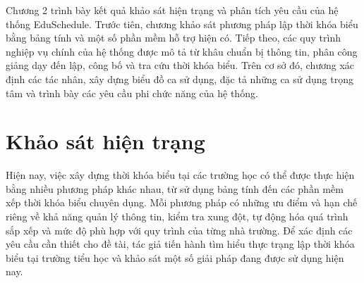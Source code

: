 \documentclass[../DoAn.tex]{subfiles}
\begin{document}




Chương 2 trình bày kết quả khảo sát hiện trạng và phân tích yêu cầu của hệ thống EduSchedule. Trước tiên, chương khảo sát phương pháp lập thời khóa biểu bằng bảng tính và một số phần mềm hỗ trợ hiện có. Tiếp theo, các quy trình nghiệp vụ chính của hệ thống được mô tả từ khâu chuẩn bị thông tin, phân công giảng dạy đến lập, công bố và tra cứu thời khóa biểu. Trên cơ sở đó, chương xác định các tác nhân, xây dựng biểu đồ ca sử dụng, đặc tả những ca sử dụng trọng tâm và trình bày các yêu cầu phi chức năng của hệ thống.
\section{Khảo sát hiện trạng}
\label{section:2.1}

Hiện nay, việc xây dựng thời khóa biểu tại các trường học có thể được thực hiện bằng nhiều phương pháp khác nhau, từ sử dụng bảng tính đến các phần mềm xếp thời khóa biểu chuyên dụng. Mỗi phương pháp có những ưu điểm và hạn chế riêng về khả năng quản lý thông tin, kiểm tra xung đột, tự động hóa quá trình sắp xếp và mức độ phù hợp với quy trình của từng nhà trường. Để xác định các yêu cầu cần thiết cho đề tài, tác giả tiến hành tìm hiểu thực trạng lập thời khóa biểu tại trường tiểu học và khảo sát một số giải pháp đang được sử dụng hiện nay.
\end{document}
